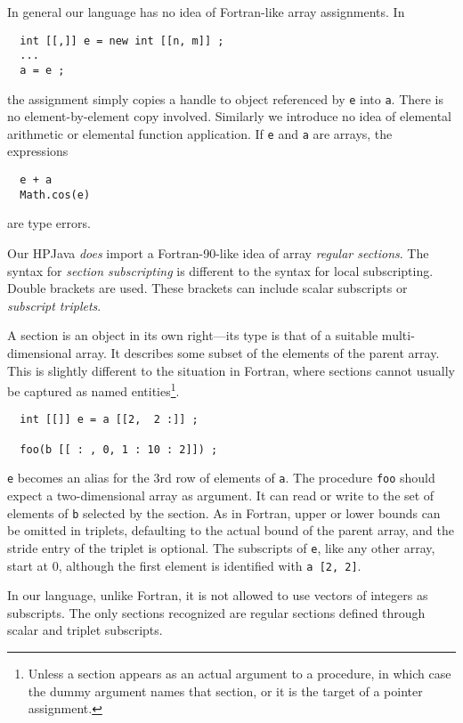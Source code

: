 In general our language has no idea of Fortran-like array assignments.  In
\small
\begin{verbatim}
  int [[,]] e = new int [[n, m]] ;
  ...
  a = e ;
\end{verbatim}
\normalsize
the assignment simply copies a handle to object referenced by {\tt e}
into {\tt a}.  There is no element-by-element copy involved.  Similarly we
introduce no idea of elemental arithmetic or elemental function application.
If {\tt e} and {\tt a} are arrays, the expressions
\small
\begin{verbatim}
  e + a
  Math.cos(e)
\end{verbatim}
\normalsize
are type errors.

Our HPJava {\em does} import a Fortran-90-like idea of array {\em regular
sections}.  The syntax for {\em section subscripting} is different to
the syntax for local subscripting.  Double brackets are used.  These
brackets can include scalar subscripts or {\em subscript triplets}.

A section is an object in its own right---its type is that of a suitable
multi-dimensional array.  It describes some subset of the elements of
the parent array.  This is slightly different to the situation in
Fortran, where sections cannot usually be captured as named
entities\footnote{Unless a section appears as an actual argument to
a procedure, in
which case the dummy argument names that section, or it is the target
of a pointer assignment.}.
\small
\begin{verbatim}
  int [[]] e = a [[2,  2 :]] ;

  foo(b [[ : , 0, 1 : 10 : 2]]) ;
\end{verbatim}
\normalsize
{\tt e} becomes an alias for the 3rd row of elements of {\tt a}.
The procedure {\tt foo} should expect a two-dimensional array as argument.
It can read or write to the set of elements of {\tt b} selected
by the section.
As in Fortran, upper or lower bounds can be omitted in triplets,
defaulting to the actual bound of the parent array, and the
stride entry of the triplet is optional.
The subscripts of {\tt e}, like any other array, start at 0,
although the first element is identified with {\tt a [2, 2]}.

In our language, unlike Fortran, it is not allowed to use vectors of
integers as subscripts.  The only sections
recognized are regular sections defined through scalar and triplet
subscripts.

